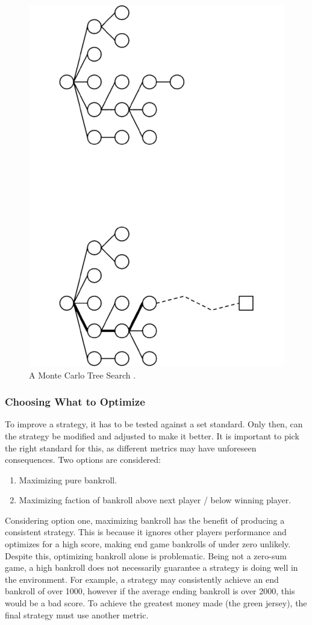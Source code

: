 \documentclass[11pt, twoside]{article}
\begin{document}
\begin{figure}[t!]
	\includegraphics[height=\textwidth,keepaspectratio,angle=-90]{MCTS.pdf}
	\caption{A Monte Carlo Tree Search \cite{baier2010power}.}
	\label{MCTSPic}
\end{figure}

\subsubsection*{Choosing What to Optimize}
To improve a strategy, it has to be tested against a set standard. Only then, can the strategy be modified and adjusted to make it better. It is important to pick the right standard for this, as different metrics may have unforeseen consequences. Two options are considered:

\begin{enumerate}
	\item Maximizing pure bankroll.
	\item Maximizing faction of bankroll above next player / below winning player.
\end{enumerate}

Considering option one, maximizing bankroll has the benefit of producing a consistent strategy. This is because it ignores other players performance and optimizes for a high score, making end game bankrolls of under zero unlikely. Despite this, optimizing bankroll alone is problematic. Being not a zero-sum game, a high bankroll does not necessarily guarantee a strategy is doing well in the environment. For example, a strategy may consistently achieve an end bankroll of over 1000, however if the average ending bankroll is over 2000, this would be a bad score. To achieve the greatest money made (the green jersey), the final strategy must use another metric.
\end{document}
